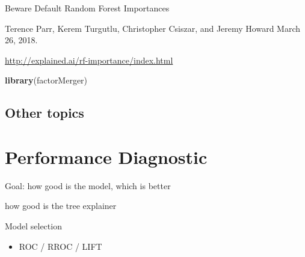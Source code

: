 \documentclass[12pt,]{krantz}
\newenvironment{Shaded}{\begin{snugshade}}{\end{snugshade}}
\newcommand{\KeywordTok}[1]{\textcolor[rgb]{0.13,0.29,0.53}{\textbf{#1}}}
\newcommand{\NormalTok}[1]{#1}
\providecommand{\tightlist}{%
  \setlength{\itemsep}{0pt}\setlength{\parskip}{0pt}}
\theoremstyle{definition}
\theoremstyle{definition}
\theoremstyle{definition}
\theoremstyle{remark}
\begin{document}
Beware Default Random Forest Importances

Terence Parr, Kerem Turgutlu, Christopher Csiszar, and Jeremy Howard
March 26, 2018.

\url{http://explained.ai/rf-importance/index.html}

\begin{Shaded}
\begin{Highlighting}[]
\KeywordTok{library}\NormalTok{(factorMerger)}
\end{Highlighting}
\end{Shaded}

\hypertarget{other-topics}{%
\subsection{Other topics}\label{other-topics}}

\citep{R-randomForestExplainer} \citep{R-ICEbox} \citep{R-ALEPlot}

\citep{R-modelDown}

\hypertarget{performanceDiagnostic}{%
\section{Performance Diagnostic}\label{performanceDiagnostic}}

Goal: how good is the model, which is better

\citep{Piltaver2016} how good is the tree explainer

Model selection

\begin{itemize}
\tightlist
\item
  ROC / RROC / LIFT
\end{itemize}
\end{document}
